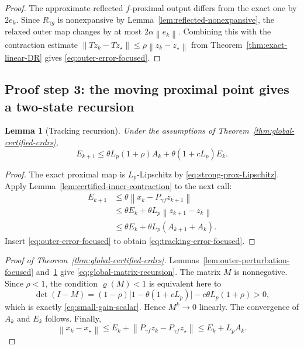 \documentclass[10pt,leqno]{amsart}
\numberwithin{equation}{section}
\numberwithin{algorithm}{section}
\newtheorem{lemma}[theorem]{Lemma}
\theoremstyle{remark}
\newcommand{\norm}[1]{\left\lVert #1 \right\rVert}
\begin{document}
\begin{proof}
The approximate reflected $f$-proximal output differs from the exact one by $2e_k$.  Since $R_{\gamma g}$ is nonexpansive by Lemma~\ref{lem:reflected-nonexpansive}, the relaxed outer map changes by at most $2\alpha\norm{e_k}$.  Combining this with the contraction estimate
$\norm{Tz_k-Tz_\star}\le\rho\norm{z_k-z_\star}$ from Theorem~\ref{thm:exact-linear-DR} gives \eqref{eq:outer-error-focused}.
\end{proof}

\subsection{Proof step 3: the moving proximal point gives a two-state recursion}

\begin{lemma}[Tracking recursion]
\label{lem:tracking-recursion-focused}
Under the assumptions of Theorem~\ref{thm:global-certified-crdrs},
\begin{equation}
\label{eq:tracking-error-focused}
    E_{k+1}
    \le \theta L_p(1+\rho)A_k
       +\theta(1+cL_p)E_k.
\end{equation}
\end{lemma}

\begin{proof}
The exact proximal map is $L_p$-Lipschitz by \eqref{eq:strong-prox-Lipschitz}.  Apply Lemma~\ref{lem:certified-inner-contraction} to the next call:
\[
\begin{aligned}
    E_{k+1}
    &\le\theta\norm{x_k-P_{\gamma f}z_{k+1}}\\
    &\le\theta E_k+\theta L_p\norm{z_{k+1}-z_k}\\
    &\le\theta E_k+\theta L_p(A_{k+1}+A_k).
\end{aligned}
\]
Insert \eqref{eq:outer-error-focused} to obtain \eqref{eq:tracking-error-focused}.
\end{proof}

\begin{proof}[Proof of Theorem~\ref{thm:global-certified-crdrs}]
Lemmas~\ref{lem:outer-perturbation-focused} and~\ref{lem:tracking-recursion-focused} give \eqref{eq:global-matrix-recursion}.
The matrix $M$ is nonnegative.  Since $\rho<1$, the condition $\varrho(M)<1$ is equivalent here to
\[
    \det(I-M)
    =(1-\rho)\bigl[1-\theta(1+cL_p)\bigr]
      -c\theta L_p(1+\rho)>0,
\]
which is exactly \eqref{eq:small-gain-scalar}.  Hence $M^k\to0$ linearly.  The convergence of $A_k$ and $E_k$ follows.  Finally,
\[
    \norm{x_k-x_\star}
    \le E_k+\norm{P_{\gamma f}z_k-P_{\gamma f}z_\star}
    \le E_k+L_pA_k.
\]
\end{proof}
\end{document}
